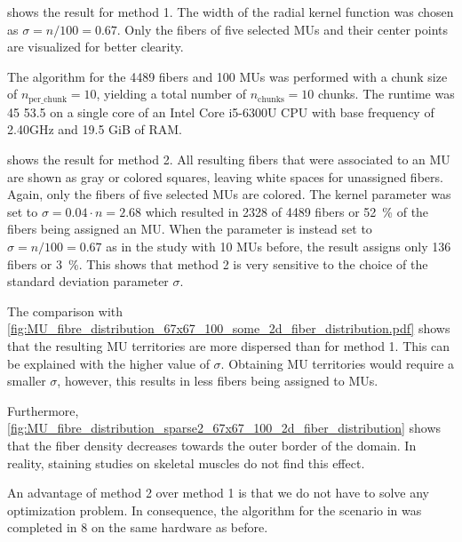  shows the result for method 1. The width of the radial kernel function was chosen as $\sigma = n/100 = \num{0.67}$. Only the fibers of five selected MUs and their center points are visualized for better clearity.

The algorithm for the 4489 fibers and 100 MUs was performed with a  chunk size of $n_\text{per\_chunk}=10$, yielding a total number of $n_\text{chunks}=10$ chunks. The runtime was \SI{45}{\min} \SI{53.5}{\sec} on a single core of an Intel Core i5-6300U CPU with base frequency of 2.40GHz and 19.5 GiB of RAM.

 shows the result for method 2. All resulting fibers that were associated to an MU are shown as gray or colored squares, leaving white spaces for unassigned fibers. Again, only the fibers of five selected MUs are colored. The kernel parameter was set to $\sigma = 0.04\cdot n = \num{2.68}$ which resulted in 2328 of 4489 fibers or \SI{52}{\percent} of the fibers being assigned an MU. When the parameter is instead set to $\sigma = n/100  = \num{0.67}$ as in the study with 10 MUs before, the result assigns only 136 fibers or \SI{3}{\percent}. This shows that method 2 is very sensitive to the choice of the standard deviation parameter $\sigma$.

The comparison with \cref{fig:MU_fibre_distribution_67x67_100_some_2d_fiber_distribution.pdf} shows that the resulting MU territories are more dispersed than for method 1. This can be explained with the higher value of $\sigma$. Obtaining  MU territories would require a smaller $\sigma$, however, this results in less fibers being assigned to MUs.

Furthermore, \cref{fig:MU_fibre_distribution_sparse2_67x67_100_2d_fiber_distribution} shows that the fiber density decreases towards the outer border of the domain. In reality, staining studies on skeletal muscles do not find this effect.

An advantage of method 2 over method 1 is that we do not have to solve any optimization problem. In consequence, the algorithm for the scenario in  was completed in \SI{8}{\sec} on the same hardware as before.

